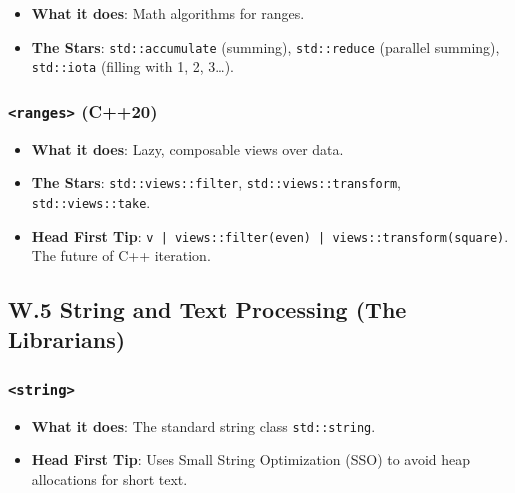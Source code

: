 \begin{itemize}
\tightlist
\item
  \textbf{What it does}: Math algorithms for ranges.
\item
  \textbf{The Stars}: \passthrough{\lstinline!std::accumulate!}
  (summing), \passthrough{\lstinline!std::reduce!} (parallel summing),
  \passthrough{\lstinline!std::iota!} (filling with 1, 2, 3\ldots).
\end{itemize}

\hypertarget{ranges-c20}{%
\subsubsection{\texorpdfstring{\texttt{\textless{}ranges\textgreater{}}
(C++20)}{\textless ranges\textgreater{} (C++20)}}\label{ranges-c20}}

\begin{itemize}
\tightlist
\item
  \textbf{What it does}: Lazy, composable views over data.
\item
  \textbf{The Stars}: \passthrough{\lstinline!std::views::filter!},
  \passthrough{\lstinline!std::views::transform!},
  \passthrough{\lstinline!std::views::take!}.
\item
  \textbf{Head First Tip}:
  \passthrough{\lstinline!v | views::filter(even) | views::transform(square)!}.
  The future of C++ iteration.
\end{itemize}

\hypertarget{w.5-string-and-text-processing-the-librarians}{%
\subsection{W.5 String and Text Processing (The
Librarians)}\label{w.5-string-and-text-processing-the-librarians}}

\hypertarget{string}{%
\subsubsection{\texorpdfstring{\texttt{\textless{}string\textgreater{}}}{\textless string\textgreater{}}}\label{string}}

\begin{itemize}
\tightlist
\item
  \textbf{What it does}: The standard string class
  \passthrough{\lstinline!std::string!}.
\item
  \textbf{Head First Tip}: Uses Small String Optimization (SSO) to avoid
  heap allocations for short text.
\end{itemize}

